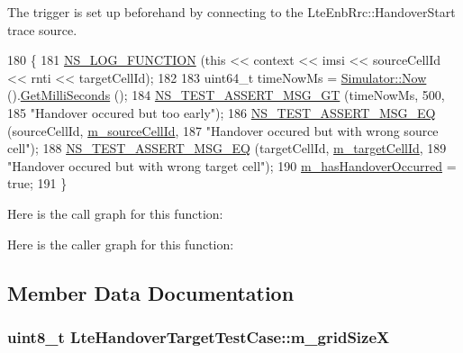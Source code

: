 The trigger is set up beforehand by connecting to the {\ttfamily Lte\+Enb\+Rrc\+::\+Handover\+Start} trace source. 
\begin{DoxyCode}
180 \{
181   \hyperlink{log-macros-disabled_8h_a90b90d5bad1f39cb1b64923ea94c0761}{NS\_LOG\_FUNCTION} (\textcolor{keyword}{this} << context << imsi << sourceCellId << rnti << targetCellId);
182 
183   uint64\_t timeNowMs = \hyperlink{group__simulator_gac3635e2e87f7ce316c89290ee1b01d0d}{Simulator::Now} ().\hyperlink{classns3_1_1Time_aba3428a8b6c4c8d9014ce44145081f34}{GetMilliSeconds} ();
184   \hyperlink{group__testing_ga868cfb773df312b867a506bdd2e3cbef}{NS\_TEST\_ASSERT\_MSG\_GT} (timeNowMs, 500,
185                          \textcolor{stringliteral}{"Handover occured but too early"});
186   \hyperlink{group__testing_ga2a9d78cffb3db8e867c35fff0b698cf5}{NS\_TEST\_ASSERT\_MSG\_EQ} (sourceCellId, \hyperlink{classLteHandoverTargetTestCase_aa919cf50724c078e53ca949f381d8b8a}{m\_sourceCellId},
187                          \textcolor{stringliteral}{"Handover occured but with wrong source cell"});
188   \hyperlink{group__testing_ga2a9d78cffb3db8e867c35fff0b698cf5}{NS\_TEST\_ASSERT\_MSG\_EQ} (targetCellId, \hyperlink{classLteHandoverTargetTestCase_adaf3b92375a8c58e00ff625af6f5a218}{m\_targetCellId},
189                          \textcolor{stringliteral}{"Handover occured but with wrong target cell"});
190   \hyperlink{classLteHandoverTargetTestCase_a43ac75885c19c66c1e3d125275f5212b}{m\_hasHandoverOccurred} = \textcolor{keyword}{true};
191 \}
\end{DoxyCode}


Here is the call graph for this function\+:




Here is the caller graph for this function\+:




\subsection{Member Data Documentation}
\subsubsection[{\texorpdfstring{m\+\_\+grid\+SizeX}{m_gridSizeX}}]{\setlength{\rightskip}{0pt plus 5cm}uint8\+\_\+t Lte\+Handover\+Target\+Test\+Case\+::m\+\_\+grid\+SizeX\hspace{0.3cm}{\ttfamily [private]}}\hypertarget{classLteHandoverTargetTestCase_ad4b214cbc0eba746b7f87d8de07c5cce}{}\label{classLteHandoverTargetTestCase_ad4b214cbc0eba746b7f87d8de07c5cce}
